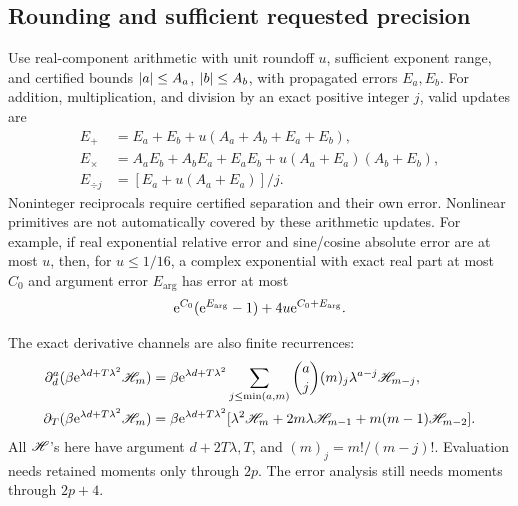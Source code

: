 \subsection{Rounding and sufficient requested precision}
Use real-component arithmetic with unit roundoff \(u\), sufficient
exponent range, and certified bounds \(\lvert a\rvert\le A_a\),
\(\lvert b\rvert\le A_b\), with propagated errors \(E_a,E_b\).
For addition, multiplication, and division by an exact positive
integer \(j\), valid updates are
\begin{subequations}\label{eq:roundoff-updates}
\begin{align}
 E_+&=E_a+E_b+u(A_a+A_b+E_a+E_b),\\
 E_\times&=A_aE_b+A_bE_a+E_aE_b
                          +u(A_a+E_a)(A_b+E_b),\\
 E_{\div j}&=[E_a+u(A_a+E_a)]/j.
\end{align}
\end{subequations}
Noninteger reciprocals require certified separation and their
own error. Nonlinear primitives are not automatically covered
by these arithmetic updates. For example, if real exponential
relative error and sine/cosine absolute error are at most \(u\),
then, for \(u\le1/16\), a complex exponential with exact real
part at most \(C_0\) and argument error \(E_{\mathrm{arg}}\) has
error at most
\[
 \mathrm e^{C_0}(\mathrm e^{E_{\mathrm{arg}}}-1)
                  +4u\mathrm e^{C_0+E_{\mathrm{arg}}}.
\]

The exact derivative channels are also finite recurrences:
\begin{subequations}\label{eq:channel-formulas}
\begin{align}
 \partial_d^a(\beta\mathrm e^{\lambda d+T\lambda^2}\mathscr H_m)
 &=\beta\mathrm e^{\lambda d+T\lambda^2}
   \sum_{j\le\min(a,m)}\binom aj(m)_j
                  \lambda^{a-j}\mathscr H_{m-j},\\
 \partial_T(\beta\mathrm e^{\lambda d+T\lambda^2}\mathscr H_m)
 &=\beta\mathrm e^{\lambda d+T\lambda^2}
   [\lambda^2\mathscr H_m+2m\lambda\mathscr H_{m-1}
                           +m(m-1)\mathscr H_{m-2}].
\end{align}
\end{subequations}
All \(\mathscr H\)'s here have argument \(d+2T\lambda,T\), and
\((m)_j=m!/(m-j)!\).
Evaluation needs retained moments only through \(2p\).
The error analysis still needs moments through \(2p+4\).

